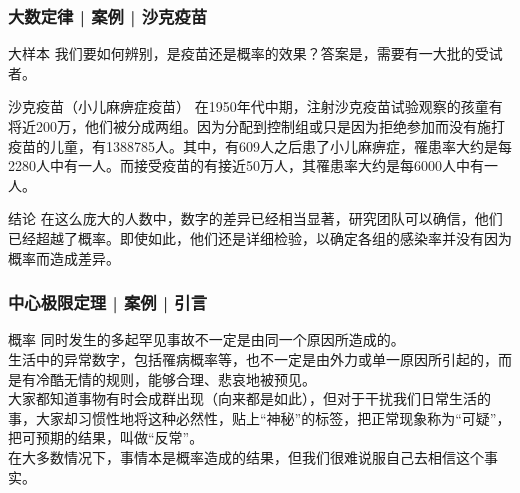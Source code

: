 \begin{frame}
  \frametitle{大数定律 | 案例 | 沙克疫苗}
  \begin{block}{大样本}
    我们要如何辨别，是疫苗还是概率的效果？答案是，需要有一大批的受试者。
  \end{block}
  \pause
  \begin{block}{沙克疫苗（小儿麻痹症疫苗）}
    在1950年代中期，注射沙克疫苗试验观察的孩童有将近200万，他们被分成两组。因为分配到控制组或只是因为拒绝参加而没有施打疫苗的儿童，有1388785人。其中，有609人之后患了小儿麻痹症，罹患率大约是每2280人中有一人。而接受疫苗的有接近50万人，其罹患率大约是每6000人中有一人。
  \end{block}
  \pause
  \begin{block}{结论}
    在这么庞大的人数中，数字的差异已经相当显著，研究团队可以确信，他们已经超越了概率。即使如此，他们还是详细检验，以确定各组的感染率并没有因为概率而造成差异。
  \end{block}
\end{frame}

\begin{frame}
  \frametitle{中心极限定理 | 案例 | 引言}
  \begin{block}{概率}
    同时发生的多起罕见事故不一定是由同一个原因所造成的。\\
    \vspace{0.5em}
    生活中的异常数字，包括罹病概率等，也不一定是由外力或单一原因所引起的，而是有冷酷无情的规则，能够合理、悲哀地被预见。\\
    \vspace{0.5em}
大家都知道事物有时会成群出现（向来都是如此），但对于干扰我们日常生活的事，大家却习惯性地将这种必然性，贴上“神秘”的标签，把正常现象称为“可疑”，把可预期的结果，叫做“反常”。\\
    \vspace{0.5em}
    在大多数情况下，事情本是概率造成的结果，但我们很难说服自己去相信这个事实。
  \end{block}
\end{frame}

